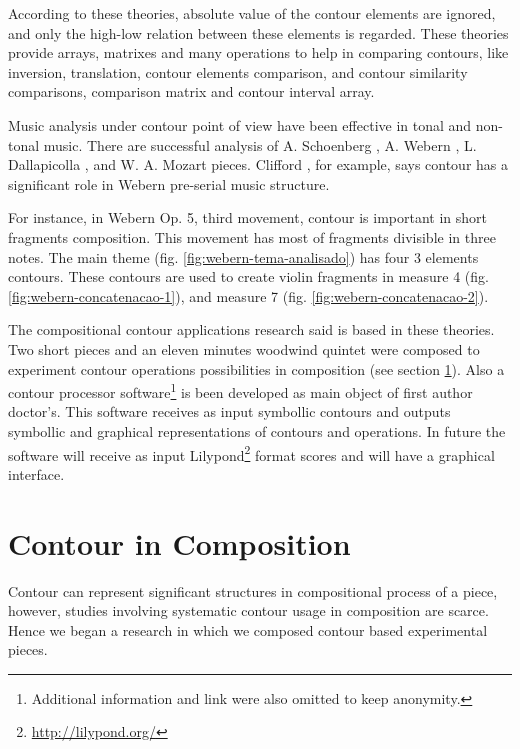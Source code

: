 According to these theories, absolute value of the contour elements
are ignored, and only the high-low relation between these elements is
regarded.  These theories provide arrays, matrixes and many operations
to help in comparing contours, like inversion, translation, contour
elements comparison, and contour similarity comparisons, comparison
matrix and contour interval array.

Music analysis under contour point of view have been effective in
tonal and non-tonal music. There are successful analysis of A.
Schoenberg \cite{friedmann85:methodology}, A. Webern
\cite{clifford95:contour}, L. Dallapicolla
\cite{marvin88:generalized}, and W. A. Mozart \cite{beard03:contour}
pieces. Clifford \cite{clifford95:contour}, for example, says contour
has a significant role in Webern pre-serial music structure.

For instance, in Webern Op. 5, third movement, contour is important in
short fragments composition. This movement has most of fragments
divisible in three notes. The main theme
(fig. \ref{fig:webern-tema-analisado}) has four 3 elements
contours. These contours are used to create violin fragments in
measure 4 (fig. \ref{fig:webern-concatenacao-1}), and measure 7
(fig. \ref{fig:webern-concatenacao-2}).

The compositional contour applications research said is based in these
theories. Two short pieces and an eleven minutes woodwind quintet were
composed to experiment contour operations possibilities in composition
(see section \ref{sec:contour-composition}). Also a contour processor
software\footnote{Additional information and link were also omitted to
  keep anonymity.} is been developed as main object of first author
doctor's. This software receives as input symbollic contours and
outputs symbollic and graphical representations of contours and
operations. In future the software will receive as input
Lilypond\footnote{\url{http://lilypond.org/}} format scores and will
have a graphical interface.

\section{Contour in Composition}
\label{sec:contour-composition}

Contour can represent significant structures in compositional process
of a piece, however, studies involving systematic contour usage in
composition are scarce. Hence we began a research in which we composed
contour based experimental pieces.

